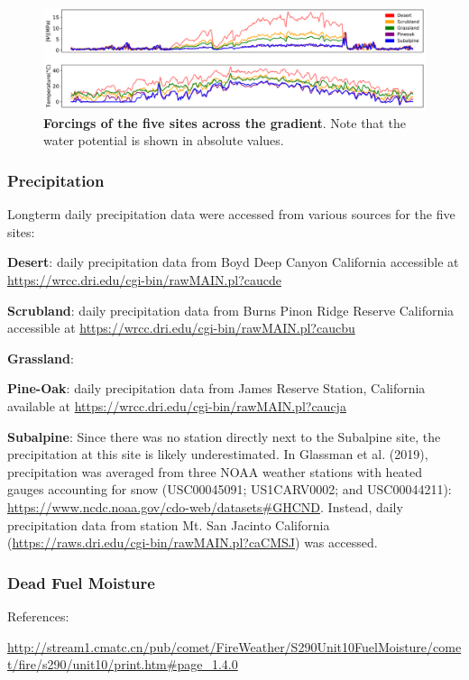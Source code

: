 \documentclass[letterpaper, 10pt]{article}
\begin{document}
\begin{figure}[h]
\centering
      \includegraphics[width=1.0\linewidth]{../figures/gradient_forcing.pdf}
      \caption{\textbf{Forcings of the five sites across the gradient}. Note that the water potential is shown in absolute values.}
      \label{fig: figure 2}
\end{figure}

\subsubsection{Precipitation}
Longterm daily precipitation data were accessed from various sources for the five sites:

\textbf{Desert}: daily precipitation data from Boyd Deep Canyon California accessible at \url{https://wrcc.dri.edu/cgi-bin/rawMAIN.pl?caucde}

\textbf{Scrubland}: daily precipitation data from Burns Pinon Ridge Reserve California accessible at \url{https://wrcc.dri.edu/cgi-bin/rawMAIN.pl?caucbu}

\textbf{Grassland}:

\textbf{Pine-Oak}: daily precipitation data from James Reserve Station, California available at \url{https://wrcc.dri.edu/cgi-bin/rawMAIN.pl?caucja}

\textbf{Subalpine}: Since there was no station directly next to the Subalpine site, the precipitation at this site is likely underestimated. In Glassman et al. (2019), precipitation was averaged from three NOAA weather stations with heated gauges accounting for snow (USC00045091; US1CARV0002; and USC00044211): \url{https://www.ncdc.noaa.gov/cdo-web/datasets#GHCND}. Instead, daily precipitation data from station Mt. San Jacinto California (\url{https://raws.dri.edu/cgi-bin/rawMAIN.pl?caCMSJ}) was accessed.

\subsubsection{Dead Fuel Moisture}
References:

\url{http://stream1.cmatc.cn/pub/comet/FireWeather/S290Unit10FuelMoisture/comet/fire/s290/unit10/print.htm#page_1.4.0}
\end{document}
